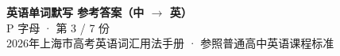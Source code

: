 \documentclass[10pt,a4paper]{article}
\begin{document}
\pagestyle{plain}

\begin{center}
{\LARGE\bfseries 英语单词默写 \quad 参考答案（中 $\to$ 英）}\\[0.22em]
{\large P 字母 · 第 3 / 7 份}\\[0.18em]
{\small 2026年上海市高考英语词汇用法手册 · 参照普通高中英语课程标准}
\end{center}

\vspace{0.2em}
\noindent{\color{rulegray}\rule{\textwidth}{0.8pt}}

\vspace{0.35em}

\vspace{0.25em}
\renewcommand{\arraystretch}{1.32}
\end{document}
